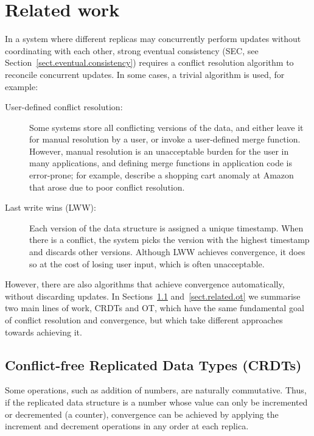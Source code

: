 \section{Related work}\label{sect.relatedwork}

In a system where different replicas may concurrently perform updates without coordinating with each
other, strong eventual consistency (SEC, see Section~\ref{sect.eventual.consistency}) requires a
conflict resolution algorithm to reconcile concurrent updates. In some cases, a trivial algorithm is
used, for example:

\begin{description}
\item[User-defined conflict resolution:] Some systems store all conflicting versions of the data,
and either leave it for manual resolution by a user, or invoke a user-defined merge function.
However, manual resolution is an unacceptable burden for the user in many applications, and defining
merge functions in application code is error-prone; for example, \citet{DeCandia:2007ui} describe a
shopping cart anomaly at Amazon that arose due to poor conflict resolution.

\item[Last write wins (LWW):] Each version of the data structure is assigned a unique timestamp.
When there is a conflict, the system picks the version with the highest timestamp and discards other
versions. Although LWW achieves convergence, it does so at the cost of losing user input, which is
often unacceptable.
\end{description}

However, there are also algorithms that achieve convergence automatically, without discarding
updates. In Sections~\ref{sect.related.crdts} and~\ref{sect.related.ot} we summarise two main lines
of work, CRDTs and OT, which have the same fundamental goal of conflict resolution and convergence,
but which take different approaches towards achieving it.

\subsection{Conflict-free Replicated Data Types (CRDTs)}\label{sect.related.crdts}

Some operations, such as addition of numbers, are naturally commutative. Thus, if the replicated
data structure is a number whose value can only be incremented or decremented (a counter),
convergence can be achieved by applying the increment and decrement operations in any order at each
replica.

